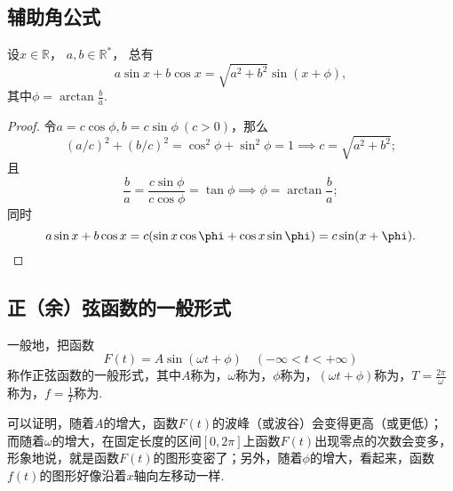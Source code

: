 \subsection{辅助角公式}
\begin{proposition}[辅助角公式]
设\(x\in\mathbb{R}\)，
\(a,b\in\mathbb{R}^*\)，
总有
\begin{equation}
	a \sin x + b \cos x = \sqrt{a^2 + b^2} \sin(x + \phi),
\end{equation}
其中\(\phi = \arctan\frac{b}{a}\).
\begin{proof}
令\(a = c \cos\phi,
b = c \sin\phi\ (c>0)\)，那么
\[
	\left(a/c\right)^2+\left(b/c\right)^2
	=\cos^2\phi+\sin^2\phi
	=1
	\implies
	c = \sqrt{a^2+b^2};
\]
且\[
	\frac{b}{a} = \frac{c \sin\phi}{c \cos\phi} = \tan\phi
	\implies
	\phi = \arctan\frac{b}{a};
\]
同时
\[
	a \sin x + b \cos x
	= c (\sin x \cos\phi + \cos x \sin\phi)
	= c \sin(x+\phi).
	\qedhere
\]
\end{proof}
\end{proposition}

\subsection{正（余）弦函数的一般形式}
\begin{definition}
一般地，把函数\[
F(t) = A \sin(\omega t + \phi) \quad (-\infty<t<+\infty)
\]称作正弦函数的一般形式，其中\(A\)称为，\(\omega\)称为，\(\phi\)称为，\((\omega t + \phi)\)称为，\(T = \frac{2\pi}{\omega}\)称为，\(f = \frac{1}{T}\)称为.
\end{definition}
可以证明，随着\(A\)的增大，函数\(F(t)\)的波峰（或波谷）会变得更高（或更低）；而随着\(\omega\)的增大，在固定长度的区间\([0,2\pi]\)上函数\(F(t)\)出现零点的次数会变多，形象地说，就是函数\(F(t)\)的图形变密了；另外，随着\(\phi\)的增大，看起来，函数\(f(t)\)的图形好像沿着\(x\)轴向左移动一样.

